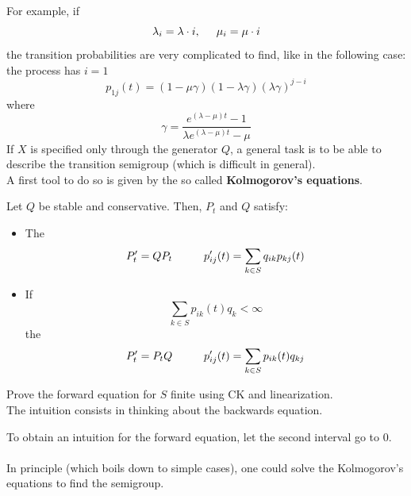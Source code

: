 \documentclass{article}
\begin{document}
	For example, if 
	\begin{equation*}
		\lambda_i = \lambda \cdot i, \hspace{0.5 cm} \mu_i = \mu \cdot i
	\end{equation*}
	the transition probabilities are very complicated to find, like in the following case: the process has $i = 1$
	\begin{equation*}
		p_{1j}(t) = (1-\mu \gamma) (1-\lambda \gamma) (\lambda \gamma)^{j-i}
	\end{equation*}
	where 
	\begin{equation*}
		\gamma= \frac{e^{(\lambda-\mu) t} - 1}{\lambda e^{(\lambda - \mu)t}-\mu}
	\end{equation*}
	If $X$ is specified only through the generator $Q$, a general task is to be able to describe the transition semigroup (which is difficult in general). \\
	A first tool to do so is given by the so called \textbf{Kolmogorov's equations}.
	\begin{theorem}
		Let $Q$ be stable and conservative. Then, $P_t$ and $Q$ satisfy:
		\begin{itemize}
			\item The 
			\begin{equation*}
				P'_t =  Q P_t \hspace{1 cm} p'_{ij}(t) = \sum_{k \in S} q_{ik}p_{kj}(t)
			\end{equation*}
			\item If 
			\begin{equation*}
				\sum_{k \in S} p_{ik}(t) q_k < \infty
			\end{equation*}
			the 
			\begin{equation*}
				P'_t = P_t Q \hspace{1 cm} p'_{ij}(t) = \sum_{k \in S} p_{ik}(t)q_{kj}
			\end{equation*}
		\end{itemize}
	\end{theorem}
	\begin{exercise}
		Prove the forward equation for $S$ finite using CK and linearization.\\
		The intuition consists in thinking about the backwards equation.
		\begin{figure}[H]
			\centering
			
		\end{figure}
		To obtain an intuition for the forward equation, let the second interval go to $0$.\\
		\\
		In principle (which boils down to simple cases), one could solve the Kolmogorov's equations to find the semigroup. \\
	\end{exercise}
\end{document}
